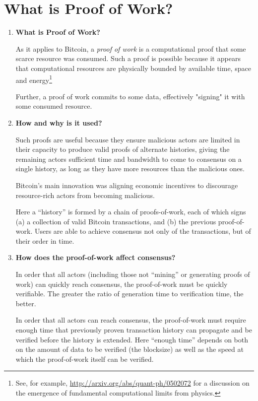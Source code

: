 \documentclass[letterpaper]{article}
\theoremstyle{xxx}
\theoremstyle{evil}
\theoremstyle{yyy}
\theoremstyle{plain}
\theoremstyle{zzz}
\begin{document}
\section{What is Proof of Work?}
\begin{enumerate}
\item \textbf{What is Proof of Work?}

As it applies to Bitcoin, a \emph{proof of work} is a computational proof
that some scarce resource was consumed. Such a proof is possible because
it appears that computational resources are physically bounded by available
time, space and energy\footnote{See, for example, \url{http://arxiv.org/abs/quant-ph/0502072}
for a discussion on the emergence of fundamental computational limits from
physics.}

Further, a proof of work commits to some data, effectively "signing" it
with some consumed resource.

\item \textbf{How and why is it used?}

Such proofs are useful because they ensure malicious actors are limited
in their capacity to produce valid proofs of alternate histories, giving
the remaining actors sufficient time and bandwidth to come to consensus
on a single history, as long as they have more resources than the malicious
ones.

Bitcoin's main innovation was aligning economic incentives to discourage
resource-rich actors from becoming malicious.

Here a ``history'' is formed by a chain of proofs-of-work, each of which
signs (a) a collection of valid Bitcoin transactions, and (b) the previous
proof-of-work. Users are able to achieve consensus not only of the transactions,
but of their order in time.

\item \textbf{How does the proof-of-work affect consensus?}

In order that all actors (including those not ``mining'' or generating proofs
of work) can quickly reach consensus, the proof-of-work must be quickly
verifiable. The greater the ratio of generation time to verification time,
the better.

In order that all actors can reach consensus, the proof-of-work must require
enough time that previously proven transaction history can propagate and be
verified before the history is extended. Here ``enough time'' depends on
both on the amount of data to be verified (the blocksize) as well as the
speed at which the proof-of-work itself can be verified.


\end{enumerate}
\end{document}
